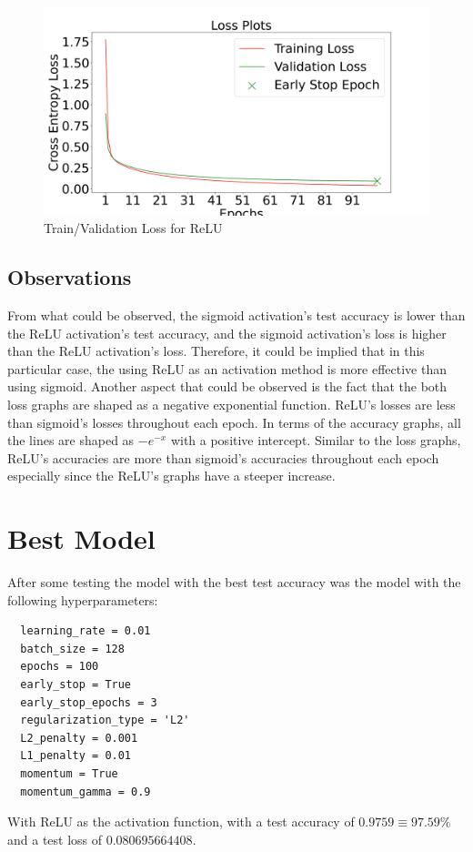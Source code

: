 \documentclass{article}
\begin{document}
\begin{figure}[h]
  \centering
  \includegraphics[width=0.8\linewidth]{include/activation-exp-loss-relu.png}
  \caption{Train/Validation Loss for ReLU}
  \label{fig:relu_loss}
\end{figure}

\subsection{Observations}
From what could be observed, the sigmoid activation's test accuracy
 is lower than the ReLU activation's test accuracy, and the sigmoid 
 activation's loss is higher than the ReLU activation's loss. 
 Therefore, it could be implied that in this particular case, the 
 using ReLU as an activation method is more effective than using 
 sigmoid. Another aspect that could be observed is the fact that 
 the both loss graphs are shaped as a negative exponential function. 
 ReLU's losses are less than sigmoid's losses throughout each epoch. 
 In terms of the accuracy graphs, all the lines are shaped as $-e^{-x}$ 
 with a positive intercept. Similar to the loss graphs, ReLU's 
 accuracies are more than sigmoid's accuracies throughout each epoch 
 especially since the ReLU's graphs have a steeper increase.
\section{Best Model}
After some testing the model with the best test accuracy was the model with the following hyperparameters:
\begin{verbatim}
  learning_rate = 0.01
  batch_size = 128
  epochs = 100
  early_stop = True
  early_stop_epochs = 3
  regularization_type = 'L2'
  L2_penalty = 0.001
  L1_penalty = 0.01
  momentum = True
  momentum_gamma = 0.9
\end{verbatim}
With ReLU as the activation function, with a test accuracy of 
$0.9759 \equiv 97.59\%$ and a test loss of $0.080695664408$.
\end{document}
